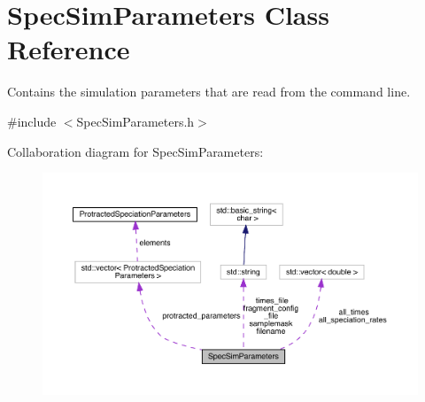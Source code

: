 \hypertarget{struct_spec_sim_parameters}{}\section{Spec\+Sim\+Parameters Class Reference}
\label{struct_spec_sim_parameters}


Contains the simulation parameters that are read from the command line.  




{\ttfamily \#include $<$Spec\+Sim\+Parameters.\+h$>$}



Collaboration diagram for Spec\+Sim\+Parameters\+:\nopagebreak
\begin{figure}[H]
\begin{center}
\leavevmode
\includegraphics[width=350pt]{struct_spec_sim_parameters__coll__graph}
\end{center}
\end{figure}
